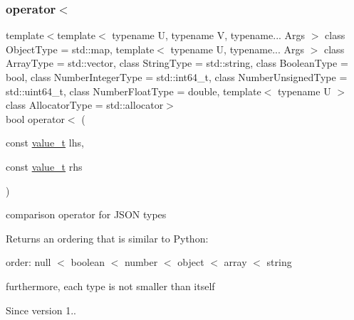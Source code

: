 \subsubsection{\texorpdfstring{operator$<$}{operator<}\hspace{0.1cm}{\footnotesize\ttfamily [1/2]}}
{\footnotesize\ttfamily template$<$template$<$ typename U, typename V, typename... Args $>$ class Object\+Type = std\+::map, template$<$ typename U, typename... Args $>$ class Array\+Type = std\+::vector, class String\+Type  = std\+::string, class Boolean\+Type  = bool, class Number\+Integer\+Type  = std\+::int64\+\_\+t, class Number\+Unsigned\+Type  = std\+::uint64\+\_\+t, class Number\+Float\+Type  = double, template$<$ typename U $>$ class Allocator\+Type = std\+::allocator$>$ \\
bool operator$<$ (\begin{DoxyParamCaption}\item[{const \hyperlink{classnlohmann_1_1basic__json_a231b02148577b69a154b2ce2c87a5522}{value\+\_\+t}}]{lhs,  }\item[{const \hyperlink{classnlohmann_1_1basic__json_a231b02148577b69a154b2ce2c87a5522}{value\+\_\+t}}]{rhs }\end{DoxyParamCaption})\hspace{0.3cm}{\ttfamily [friend]}}



comparison operator for J\+S\+ON types 

Returns an ordering that is similar to Python\+:
\begin{DoxyItemize}
\item order\+: null $<$ boolean $<$ number $<$ object $<$ array $<$ string
\item furthermore, each type is not smaller than itself
\end{DoxyItemize}

\begin{DoxySince}{Since}
version 1.. 
\end{DoxySince}
\hypertarget{classnlohmann_1_1basic__json_aacd442b66140c764c594ac8ad7dfd5b3}{}\label{classnlohmann_1_1basic__json_aacd442b66140c764c594ac8ad7dfd5b3} 
